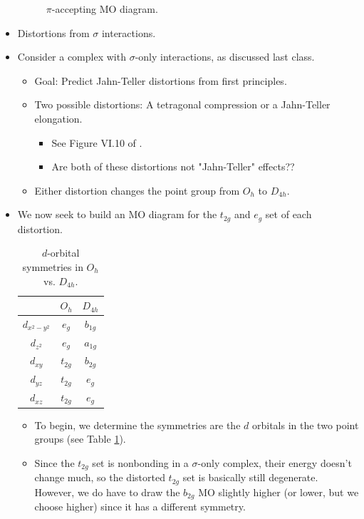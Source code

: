 \documentclass[../notes.tex]{subfiles}
\begin{document}
\begin{itemize}
\begin{figure}[h!]
        \caption{ $\pi$-accepting MO diagram.}
        \label{fig:MOsML6piAcc}
    \end{figure}
    \item Distortions from $\sigma$ interactions.
    \item Consider a  complex with $\sigma$-only interactions, as discussed last class.
    \begin{itemize}
        \item Goal: Predict Jahn-Teller distortions from first principles.
        \item Two possible distortions: A tetragonal compression or a Jahn-Teller elongation.
        \begin{itemize}
            \item See Figure VI.10 of \textcite{bib:CHEM20100Notes}.
            \item Are both of these distortions not "Jahn-Teller" effects??
        \end{itemize}
        \item Either distortion changes the point group from $O_h$ to $D_{4h}$.
    \end{itemize}
    \item We now seek to build an MO diagram for the $t_{2g}$ and $e_g$ set of each distortion.
    \begin{table}[h!]
        \centering
        \small
        \renewcommand{\arraystretch}{1.2}
        \begin{tabular}{c|c|c}
             & $O_h$ & $D_{4h}$\\
            \hline
            $d_{x^2-y^2}$ & $e_g$ & $b_{1g}$\\
            $d_{z^2}$ & $e_g$ & $a_{1g}$\\
            $d_{xy}$ & $t_{2g}$ & $b_{2g}$\\
            $d_{yz}$ & $t_{2g}$ & $e_g$\\
            $d_{xz}$ & $t_{2g}$ & $e_g$\\
        \end{tabular}
        \caption{$d$-orbital symmetries in $O_h$ vs. $D_{4h}$.}
        \label{tab:dOrbOhD4h}
    \end{table}
    \begin{itemize}
        \item To begin, we determine the symmetries are the $d$ orbitals in the two point groups (see Table \ref{tab:dOrbOhD4h}).
        \item Since the $t_{2g}$ set is nonbonding in a $\sigma$-only complex, their energy doesn't change much, so the distorted $t_{2g}$ set is basically still degenerate. However, we do have to draw the $b_{2g}$ MO slightly higher (or lower, but we choose higher) since it has a different symmetry.

\end{itemize}
\end{itemize}
\end{document}
